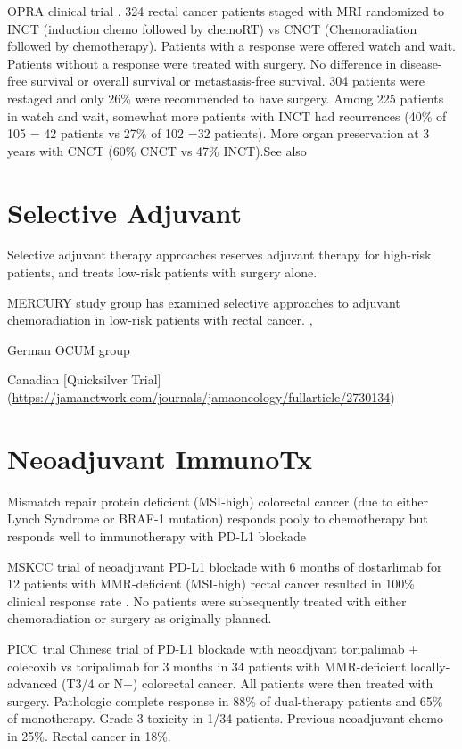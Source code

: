 \documentclass[
]{book}
\begin{document}
OPRA clinical trial \citep{garcia-aguilar2546}. 324 rectal cancer patients staged with MRI randomized to INCT (induction chemo followed by chemoRT) vs CNCT (Chemoradiation followed by chemotherapy). Patients with a response were offered watch and wait. Patients without a response were treated with surgery. No difference in disease-free survival or overall survival or metastasis-free survival. 304 patients were restaged and only 26\% were recommended to have surgery. Among 225 patients in watch and wait, somewhat more patients with INCT had recurrences (40\% of 105 = 42 patients vs 27\% of 102 =32 patients). More organ preservation at 3 years with CNCT (60\% CNCT vs 47\% INCT).See also \citep{smith767}

\hypertarget{selective-adjuvant}{%
\section{Selective Adjuvant}\label{selective-adjuvant}}

Selective adjuvant therapy approaches reserves adjuvant therapy for high-risk patients, and treats low-risk patients with surgery alone.

MERCURY study group has examined selective approaches to adjuvant chemoradiation in low-risk patients with rectal cancer. \citep{taylor711}, \citep{strassburg2790}

German OCUM group \citep{kreis25} \citep{ruppert1519}

Canadian {[}Quicksilver Trial{]} (\url{https://jamanetwork.com/journals/jamaoncology/fullarticle/2730134})

\hypertarget{neoadjuvant-immunotx}{%
\section{Neoadjuvant ImmunoTx}\label{neoadjuvant-immunotx}}

Mismatch repair protein deficient (MSI-high) colorectal cancer (due to either Lynch Syndrome or BRAF-1 mutation) responds pooly to chemotherapy but responds well to immunotherapy with PD-L1 blockade

MSKCC trial of neoadjuvant PD-L1 blockade with 6 months of dostarlimab for 12 patients with MMR-deficient (MSI-high) rectal cancer resulted in 100\% clinical response rate \citep{cercek2363}. No patients were subsequently treated with either chemoradiation or surgery as originally planned.

PICC trial \citep{hu38} Chinese trial of PD-L1 blockade with neoadjvant toripalimab + colecoxib vs toripalimab for 3 months in 34 patients with MMR-deficient locally-advanced (T3/4 or N+) colorectal cancer. All patients were then treated with surgery. Pathologic complete response in 88\% of dual-therapy patients and 65\% of monotherapy. Grade 3 toxicity in 1/34 patients. Previous neoadjuvant chemo in 25\%. Rectal cancer in 18\%.
\end{document}
